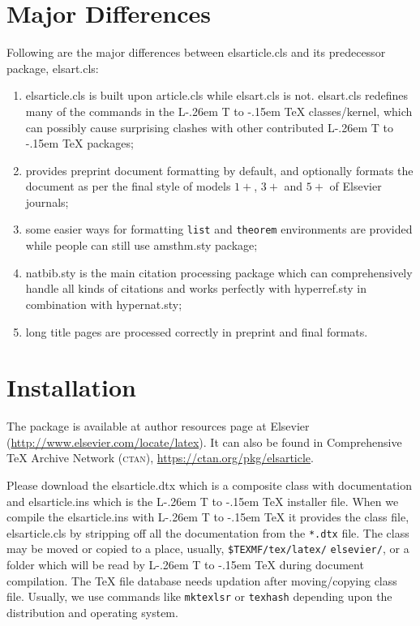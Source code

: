 \documentclass[a4paper,12pt]{article}
\makeatletter
\def\file#1{\textsf{#1}\xspace}
\DeclareRobustCommand{\LaTeX}{L\kern-.26em%
        {\sbox\z@ T%
         \vbox to\ht\z@{\hbox{\check@mathfonts
           \fontsize\sf@size\z@
           \math@fontsfalse\selectfont
          A\,}%
         \vss}%
        }%
     \kern-.15em%
    \TeX}
\makeatother
\begin{document}
\section{Major Differences}

Following are the major differences between \file{elsarticle.cls}
and its predecessor package, \file{elsart.cls}:

\begin{enumerate}[\textbullet]
\item \file{elsarticle.cls} is built upon \file{article.cls}
while \file{elsart.cls} is not. \file{elsart.cls} redefines
many of the commands in the \LaTeX{} classes/kernel, which can
possibly cause surprising clashes with other contributed
\LaTeX{} packages;

\item provides preprint document formatting by default, and
optionally formats the document as per the final
style of models $1+$, $3+$ and $5+$ of Elsevier journals;

\item some easier ways for formatting \verb+list+ and
\verb+theorem+ environments are provided while people can still
use \file{amsthm.sty} package;

\item \file{natbib.sty} is the main citation processing package
  which can comprehensively handle all kinds of citations and
works perfectly with \file{hyperref.sty} in combination with
\file{hypernat.sty};

\item long title pages are processed correctly in preprint and
  final formats.

\end{enumerate}

\section{Installation}

The package is available at author resources page at Elsevier
(\url{http://www.elsevier.com/locate/latex}).
It can also be found in Comprehensive
\TeX{} Archive Network (\textsc{ctan}), 
\url{https://ctan.org/pkg/elsarticle}.

Please download the \file{elsarticle.dtx} which is a composite
class with documentation and \file{elsarticle.ins} which is the
\LaTeX{} installer file. When we compile the
\file{elsarticle.ins} with \LaTeX{} it provides the class file,
\file{elsarticle.cls} by
stripping off all the documentation from the \verb+*.dtx+ file.
The class may be moved or copied to a place, usually,
\verb+$TEXMF/tex/latex/+ %
\verb+elsevier/+, 
or a folder which will be read                   
by \LaTeX{} during document compilation.  The \TeX{} file
database needs updation after moving/copying class file.  Usually,
we use commands like \verb+mktexlsr+ or \verb+texhash+ depending
upon the distribution and operating system.
\end{document}
